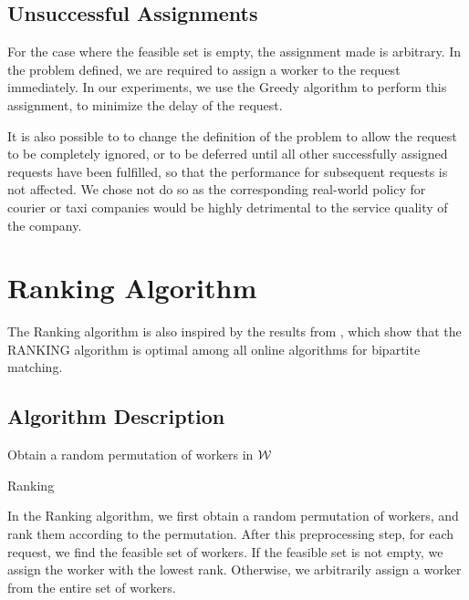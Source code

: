 \documentclass[urop]{socreport}
\begin{document}
\subsection{Unsuccessful Assignments}
For the case where the feasible set is empty, the assignment made is arbitrary. In the problem defined, we are required to assign a worker to the request immediately. In our experiments, we use the Greedy algorithm to perform this assignment, to minimize the delay of the request. 

It is also possible to to change the definition of the problem to allow the request to be completely ignored, or to be deferred until all other successfully assigned requests have been fulfilled, so that the performance for subsequent requests is not affected. We chose not do so as the corresponding real-world policy for courier or taxi companies would be highly detrimental to the service quality of the company.

\section{Ranking Algorithm}
The Ranking algorithm is also inspired by the results from \cite{karp}, which show that the RANKING algorithm is optimal among all online algorithms for bipartite matching.

\subsection{Algorithm Description}
\begin{algorithm}[H]
\SetAlgoLined
{}
 Obtain a random permutation of workers in $\mathcal{W}$\;
 \caption{Ranking}
\end{algorithm} 


\newpage
In the Ranking algorithm, we first obtain a random permutation of workers, and rank them according to the permutation. After this preprocessing step, for each request, we find the feasible set of workers. If the feasible set is not empty, we assign the worker with the lowest rank. Otherwise, we arbitrarily assign a worker from the entire set of workers.
\end{document}
